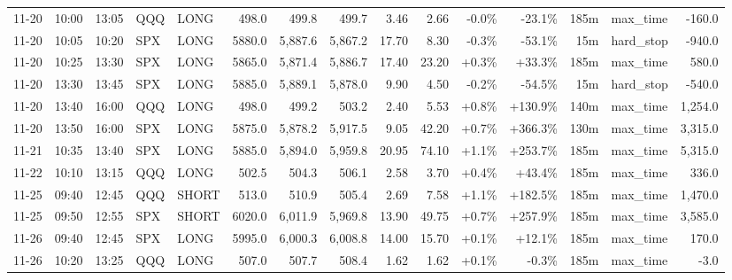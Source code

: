 \documentclass[11pt,a4paper,twoside]{article}
\begin{document}
\begin{landscape}
\begin{center}
\begin{longtable}{>{\color{txtmain}}l l l l l r r r r r r r r >{\color{txtmain}}l r}
11-20 & 10:00 & 13:05 & QQQ & LONG & 498.0 & 499.8 & 499.7 & 3.46 & 2.66 & \textcolor{lossred}{-0.0\%} & \textcolor{lossred}{-23.1\%} & 185m & max\_time & \textcolor{lossred}{-160.0} \\
11-20 & 10:05 & 10:20 & SPX & LONG & 5880.0 & 5,887.6 & 5,867.2 & 17.70 & 8.30 & \textcolor{lossred}{-0.3\%} & \textcolor{lossred}{-53.1\%} & 15m & hard\_stop & \textcolor{lossred}{-940.0} \\
11-20 & 10:25 & 13:30 & SPX & LONG & 5865.0 & 5,871.4 & 5,886.7 & 17.40 & 23.20 & \textcolor{wingreen}{+0.3\%} & \textcolor{wingreen}{+33.3\%} & 185m & max\_time & \textcolor{wingreen}{580.0} \\
11-20 & 13:30 & 13:45 & SPX & LONG & 5885.0 & 5,889.1 & 5,878.0 & 9.90 & 4.50 & \textcolor{lossred}{-0.2\%} & \textcolor{lossred}{-54.5\%} & 15m & hard\_stop & \textcolor{lossred}{-540.0} \\
11-20 & 13:40 & 16:00 & QQQ & LONG & 498.0 & 499.2 & 503.2 & 2.40 & 5.53 & \textcolor{wingreen}{+0.8\%} & \textcolor{wingreen}{+130.9\%} & 140m & max\_time & \textcolor{wingreen}{1,254.0} \\
11-20 & 13:50 & 16:00 & SPX & LONG & 5875.0 & 5,878.2 & 5,917.5 & 9.05 & 42.20 & \textcolor{wingreen}{+0.7\%} & \textcolor{wingreen}{+366.3\%} & 130m & max\_time & \textcolor{wingreen}{3,315.0} \\
11-21 & 10:35 & 13:40 & SPX & LONG & 5885.0 & 5,894.0 & 5,959.8 & 20.95 & 74.10 & \textcolor{wingreen}{+1.1\%} & \textcolor{wingreen}{+253.7\%} & 185m & max\_time & \textcolor{wingreen}{5,315.0} \\
11-22 & 10:10 & 13:15 & QQQ & LONG & 502.5 & 504.3 & 506.1 & 2.58 & 3.70 & \textcolor{wingreen}{+0.4\%} & \textcolor{wingreen}{+43.4\%} & 185m & max\_time & \textcolor{wingreen}{336.0} \\
11-25 & 09:40 & 12:45 & QQQ & SHORT & 513.0 & 510.9 & 505.4 & 2.69 & 7.58 & \textcolor{wingreen}{+1.1\%} & \textcolor{wingreen}{+182.5\%} & 185m & max\_time & \textcolor{wingreen}{1,470.0} \\
11-25 & 09:50 & 12:55 & SPX & SHORT & 6020.0 & 6,011.9 & 5,969.8 & 13.90 & 49.75 & \textcolor{wingreen}{+0.7\%} & \textcolor{wingreen}{+257.9\%} & 185m & max\_time & \textcolor{wingreen}{3,585.0} \\
11-26 & 09:40 & 12:45 & SPX & LONG & 5995.0 & 6,000.3 & 6,008.8 & 14.00 & 15.70 & \textcolor{wingreen}{+0.1\%} & \textcolor{wingreen}{+12.1\%} & 185m & max\_time & \textcolor{wingreen}{170.0} \\
11-26 & 10:20 & 13:25 & QQQ & LONG & 507.0 & 507.7 & 508.4 & 1.62 & 1.62 & \textcolor{wingreen}{+0.1\%} & \textcolor{lossred}{-0.3\%} & 185m & max\_time & \textcolor{lossred}{-3.0} \\

\end{longtable}
\end{center}
\end{landscape}
\end{document}
